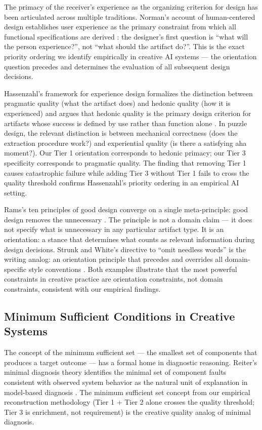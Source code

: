 The primacy of the receiver's experience as the organizing criterion for design has
been articulated across multiple traditions. Norman's account of human-centered design
establishes user experience as the primary constraint from which all functional
specifications are derived \cite{norman2013design}: the designer's first question is
``what will the person experience?'', not ``what should the artifact do?''. This is
the exact priority ordering we identify empirically in creative AI systems --- the
orientation question precedes and determines the evaluation of all subsequent design
decisions.

Hassenzahl's framework for experience design formalizes the distinction between
pragmatic quality (what the artifact does) and hedonic quality (how it is experienced)
and argues that hedonic quality is the primary design criterion for artifacts whose
success is defined by use rather than function alone \cite{hassenzahl2010experience}.
In puzzle design, the relevant distinction is between mechanical correctness (does the
extraction procedure work?) and experiential quality (is there a satisfying aha moment?).
Our Tier 1 orientation corresponds to hedonic primacy; our Tier 3 specificity
corresponds to pragmatic quality. The finding that removing Tier 1 causes catastrophic
failure while adding Tier 3 without Tier 1 fails to cross the quality threshold
confirms Hassenzahl's priority ordering in an empirical AI setting.

Rams's ten principles of good design converge on a single meta-principle: good design
removes the unnecessary \cite{rams1976design}. The principle is not a domain claim
--- it does not specify what is unnecessary in any particular artifact type. It is an
orientation: a stance that determines what counts as relevant information during design
decisions. Strunk and White's directive to ``omit needless words'' is the writing
analog: an orientation principle that precedes and overrides all domain-specific style
conventions \cite{strunkwhite1999}. Both examples illustrate that the most powerful
constraints in creative practice are orientation constraints, not domain constraints,
consistent with our empirical findings.

\subsection{Minimum Sufficient Conditions in Creative Systems}

The concept of the minimum sufficient set --- the smallest set of components that
produces a target outcome --- has a formal home in diagnostic reasoning. Reiter's
minimal diagnosis theory identifies the minimal set of component faults consistent
with observed system behavior as the natural unit of explanation in model-based
diagnosis \cite{reiter1987theory}. The minimum sufficient set concept from our
empirical reconstruction methodology (Tier 1 + Tier 2 alone crosses the quality
threshold; Tier 3 is enrichment, not requirement) is the creative quality analog of
minimal diagnosis.

